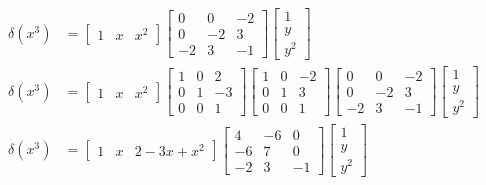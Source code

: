 \documentclass{standalone}
\begin{document}
  \begin{align} \nonumber %
  	\delta(x^3) &=
  	\begin{bmatrix}
  			1 & x & x^2
  	\end{bmatrix}
  	\begin{bmatrix}
  		0 & 0 & -2 \\
  		0 & -2 & 3 \\
  		-2 & 3 & -1
  	\end{bmatrix}
  	\begin{bmatrix}
  		1 \\
  		y \\
  		y^2
  	\end{bmatrix} \\ \nonumber %
  	\delta(x^3) &=
  	\begin{bmatrix}
  		1 & x & x^2
  	\end{bmatrix}
  	\begin{bmatrix}
  		1 & 0 & 2 \\
  		0 & 1 & -3 \\
  		0 & 0 & 1
  	\end{bmatrix}
  	\begin{bmatrix}
  		1 & 0 & -2 \\
  		0 & 1 & 3 \\
  		0 & 0 & 1
  	\end{bmatrix}
  	\begin{bmatrix}
  		0 & 0 & -2 \\
  		0 & -2 & 3 \\
  		-2 & 3 & -1
  	\end{bmatrix}
  	\begin{bmatrix}
  		1 \\
  		y \\
  		y^2
  	\end{bmatrix} \\ \nonumber %
  	\delta(x^3) &=
  	\begin{bmatrix}
  			1 & x & 2 - 3x + x^2
  	\end{bmatrix}
  	\begin{bmatrix}
  		4 & -6 & 0 \\
  		-6 & 7 & 0 \\
  		-2 & 3 & -1
  	\end{bmatrix}
  	\begin{bmatrix}
  		1 \\
  		y \\
  		y^2
  	\end{bmatrix} \\ \nonumber %
  \end{align}
\end{document}
